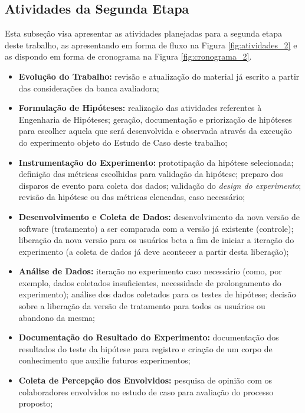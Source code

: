 \subsection{Atividades da Segunda Etapa}
\label{cronograma2}

Esta subseção visa apresentar as atividades planejadas para a segunda etapa deste trabalho,
as apresentando em forma de fluxo na Figura \ref{fig:atividades_2} e as dispondo em forma de cronograma na Figura \ref{fig:cronograma_2}.

\begin{itemize}
    \item \textbf{Evolução do Trabalho:} revisão e atualização do material já escrito a partir das considerações da banca avaliadora;
    \item \textbf{Formulação de Hipóteses:} realização das atividades referentes à Engenharia de Hipóteses; geração, documentação e priorização de hipóteses para escolher aquela que será desenvolvida e observada através da execução do experimento objeto do Estudo de Caso deste trabalho;
    \item \textbf{Instrumentação do Experimento:} prototipação da hipótese selecionada; definição das métricas escolhidas para validação da hipótese; preparo dos disparos de evento para coleta dos dados; validação do \textit{design do experimento}; revisão da hipótese ou das métricas elencadas, caso necessário;
    \item \textbf{Desenvolvimento e Coleta de Dados:} desenvolvimento da nova versão de software (tratamento) a ser comparada com a versão já existente (controle); liberação da nova versão para os usuários beta a fim de iniciar a iteração do experimento (a coleta de dados já deve acontecer a partir desta liberação);
    \item \textbf{Análise de Dados:} iteração no experimento caso necessário (como, por exemplo, dados coletados insuficientes, necessidade de prolongamento do experimento); análise dos dados coletados para os testes de hipótese; decisão sobre a liberação da versão de tratamento para todos os usuários ou abandono da mesma;
    \item \textbf{Documentação do Resultado do Experimento:} documentação dos resultados do teste da hipótese para registro e criação de um corpo de conhecimento que auxilie futuros experimentos;
    \item \textbf{Coleta de Percepção dos Envolvidos:} pesquisa de opinião com os colaboradores envolvidos no estudo de caso para avaliação do processo proposto;

\end{itemize}
